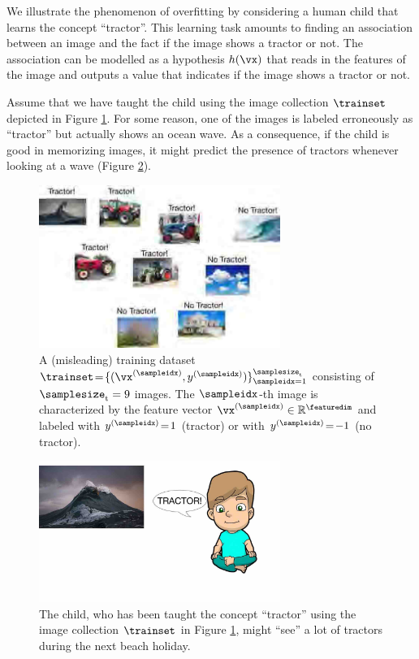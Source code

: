 \documentclass[12pt]{report}
\begin{document}
We illustrate the phenomenon of overfitting by considering 
a human child that learns the concept ``tractor''. This 
learning task amounts to finding an association between 
an image and the fact if the image shows a tractor or not. 
The association can be modelled as a hypothesis $h(\vx)$ 
that reads in the features of the image and outputs a value 
that indicates if the image shows a tractor or not. 

Assume that we have taught the child using the image collection 
$\trainset$ depicted in Figure \ref{fig_misleading_data_set}. For some 
reason, one of the images is labeled erroneously as ``tractor'' 
but actually shows an ocean wave. As a consequence, if the child is 
good in memorizing images, it might predict the presence of tractors 
whenever looking at a wave (Figure \ref{equ_wave_as_tractor}). 

\begin{figure}[htbp]
	\centering
	\includegraphics[width=0.7\textwidth]{LabeledDataTractorOverfitting1.jpg}  
	\caption{A (misleading) training dataset $\trainset \!=\! \{ (\vx^{(\sampleidx)},y^{(\sampleidx)}) \}_{\sampleidx=1}^{\samplesize_{\rm t}}$ 
		consisting of $\samplesize_{\rm t}=9$ images. The $\sampleidx$-th image is characterized by the feature vector $\vx^{(\sampleidx)} \in \mathbb{R}^{\featuredim}$ and labeled with $y^{(\sampleidx)}\!=\!1$ 
		(tractor) or with $y^{(\sampleidx)}\!=\!-1$ (no tractor).}
	\label{fig_misleading_data_set}
\end{figure}


\begin{figure}[htbp]
	\centering
	\includegraphics[width=0.7\textwidth]{OverfittingSample.jpg}   
	\caption{The child, who has been taught the concept ``tractor'' using the image collection 
		$\trainset$ in Figure \ref{fig_misleading_data_set}, might ``see'' a lot of tractors during the next beach holiday.}
	\label{equ_wave_as_tractor}   
\end{figure}
\end{document}
